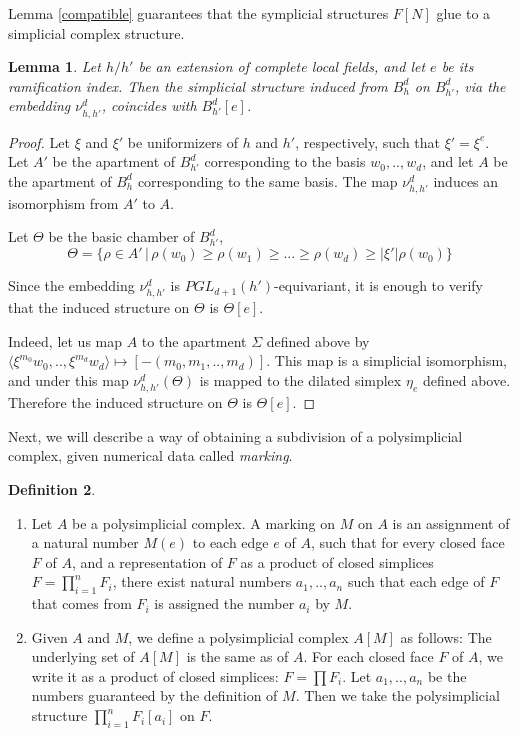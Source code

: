 \documentclass{amsart}
\theoremstyle{theorem}
\theoremstyle{lemma}
\newtheorem{lemma}{Lemma}[section]
\theoremstyle{prop}
\theoremstyle{definition}
\newtheorem{definition}[lemma]{Definition}
\theoremstyle{corollary}
\theoremstyle{remark}
\newcommand{\h}{h}
\begin{document}
Lemma \ref{compatible} guarantees that the symplicial structures $F[N]$ glue to a simplicial complex structure.

\begin{lemma} \label{twostructs}
Let $\h/\h'$ be an extension of complete local fields, and let $e$ be its ramification index. Then the simplicial structure induced from $B^d_\h$ on $B^d_{\h'}$, via the embedding $\nu^d_{\h,\h'}$, coincides with $B^d_{\h'}[e]$. 
\end{lemma}

\begin{proof} Let $\xi$ and $\xi'$ be uniformizers of $\h$ and $\h'$, respectively, such that $\xi' = \xi ^ e$. Let $A'$ be the apartment of $B^d_{\h'}$ corresponding to the basis $w_0,..,w_d$, and let $A$ be the apartment of $B^d_{h}$ corresponding to the same basis. The map $\nu^d_{\h,\h'}$ induces an isomorphism from $A'$ to $A$. 

Let $\Theta$ be the basic chamber of $B^d_{\h'}$, 
$$\Theta= \{\rho\in A' \, |\,  \rho(w_0) \geq \rho(w_1) \geq ... \geq \rho(w_d) \geq |\xi'| \rho(w_0) \}$$

Since the embedding $\nu^d_{\h,\h'}$ is $PGL_{d+1}(h')$-equivariant, it is enough to verify that the induced structure on $\Theta$ is $\Theta[e]$. 

Indeed, let us map $A$ to the apartment $\Sigma$ defined above by $\langle \xi^{m_0} w_0,..,\xi^{m_d} w_d \rangle \mapsto [-(m_0, m_1,..,m_d)]$. This map is a simplicial isomorphism, and under this map  $\nu^d_{\h,\h'}(\Theta)$ is mapped to the dilated simplex $\eta_e$ defined above. Therefore the induced structure on $\Theta$ is $\Theta[e]$.\end{proof}

Next, we will describe a way of obtaining a subdivision of a polysimplicial complex, given numerical data called \emph{marking}. 
\begin{definition}\begin{enumerate} \item Let $A$ be a polysimplicial complex. A marking on $M$ on $A$ is an assignment of a natural number $M(e)$ to each edge $e$ of $A$, such that for every closed face $F$ of $A$, and a representation of $F$ as a product of closed simplices $F=\prod_{i=1}^nF_i$, there exist natural numbers $a_1,..,a_n$ such that each edge of $F$ that comes from $F_i$ is assigned the number $a_i$ by $M$.

\item Given $A$ and $M$, we define a polysimplicial complex $A[M]$ as follows: The underlying set of $A[M]$ is the same as of $A$. For each closed face $F$ of $A$, we write it as a product of closed simplices: $F = \prod F_i$. Let $a_1,..,a_n$ be the numbers guaranteed by the definition of $M$. Then we take the polysimplicial structure $\prod_{i=1}^n F_i[a_i]$ on $F$.
\end{enumerate}
\end{definition}
\end{document}
